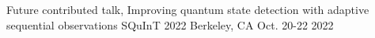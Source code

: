 

\begin{cventries}

  \cventry
    {Future contributed talk, Improving quantum state detection with adaptive sequential observations} %
    {SQuInT 2022} %
    {Berkeley, CA} %
    {Oct. 20-22 2022} %
    {}

\end{cventries}
